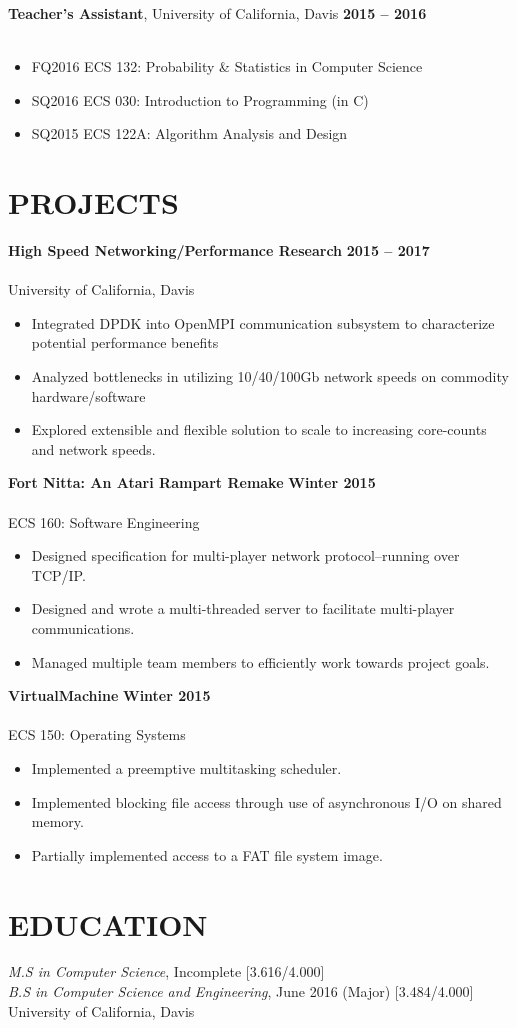 \documentclass[10pt, center]{res} %
\newcommand{\bullets}[1]{
	\begin{itemize}[noitemsep]
		#1
	\end{itemize}
	\vspace{-6pt}
}
\newcommand{\experience}[5]{
	{\bf #1}, #2 \hfill {\bf #3} \\ \vspace{-10pt}
	\ifx\hfbuzz#4\hfbuzz
		\vspace{-4pt}
	\else
		{\vspace{-4pt} \\ #4}
	\fi
	\bullets{#5}
}
\newcommand{\project}[4]{
	{\bf #1} \hfill {\bf #3} \\ \vspace{-14pt} \\
	{\small #2}
	\bullets{#4}
}
\begin{document}
\begin{resume}
	\experience{Teacher's Assistant}{University of California, Davis}{2015 -- 2016}{}{
		\item[] \hspace{-12pt} FQ2016 ECS 132: Probability \& Statistics in Computer Science %
		\item[] \hspace{-12pt} SQ2016 ECS 030: Introduction to Programming (in C) %
		\item[] \hspace{-12pt} SQ2015 ECS 122A: Algorithm Analysis and Design %
	}

\section{PROJECTS}
    \project{High Speed Networking/Performance Research}{University of California, Davis}{2015 -- 2017}{
		\item Integrated DPDK into OpenMPI communication subsystem to characterize potential performance benefits
        \item Analyzed bottlenecks in utilizing 10/40/100Gb network speeds on commodity hardware/software
        \item Explored extensible and flexible solution to scale to increasing core-counts and network speeds.
	}

	\project{Fort Nitta: An Atari Rampart Remake}{ECS 160: Software Engineering}{Winter 2015}{
        \item Designed specification for multi-player network protocol--running over TCP/IP.
        \item Designed and wrote a multi-threaded server to facilitate multi-player communications.
        \item Managed multiple team members to efficiently work towards project goals.
    }

    \project{VirtualMachine}{ECS 150: Operating Systems}{Winter 2015}{
		\item Implemented a preemptive multitasking scheduler.
		\item Implemented blocking file access through use of asynchronous I/O on shared memory.
		\item Partially implemented access to a FAT file system image.
	}

\section{EDUCATION}
{\sl M.S in Computer Science}, Incomplete  \hfill [3.616/4.000]  \\
{\sl B.S in Computer Science and Engineering}, June 2016 \hfill (Major) [3.484/4.000]  \\
University of California, Davis


\end{resume}
\end{document}
